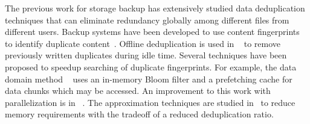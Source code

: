 The previous work for storage backup has extensively studied  data deduplication techniques that
can eliminate redundancy 
globally among different files from different users.
Backup systems have been developed to use content fingerprints to identify duplicate
content~\cite{venti02,Rhea2008}.  Offline deduplication is 
used in ~\cite{EMC,NetAppOffline} to remove previously written duplicates during idle time.
Several techniques have been proposed to speedup searching of duplicate
fingerprints. For example, the data domain method ~\cite{bottleneck08} 
uses  an in-memory Bloom filter and a prefetching cache for data chunks  which may be
accessed.  An improvement to this work with parallelization is in ~\cite{MAD210,DEBAR}.
The approximation techniques are studied in~\cite{extreme_binning09,Guo2011,WeiZhangIEEE}  
to reduce memory requirements with the tradeoff of a reduced deduplication ratio.


